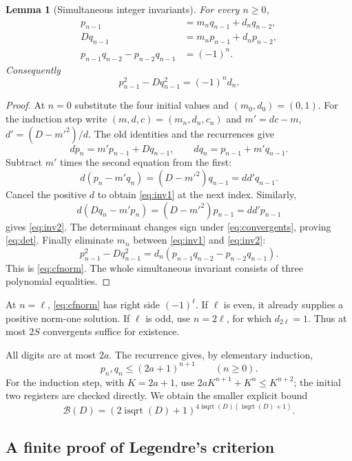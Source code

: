 \documentclass[11pt,letterpaper]{article}
\newtheorem{lemma}[theorem]{Lemma}
\theoremstyle{definition}
\newcommand{\isqrt}{\operatorname{isqrt}}
\newcommand{\CFB}{\mathcal B}
\begin{document}
\begin{lemma}[Simultaneous integer invariants]\label{lem:cfinvariants}
For every $n\ge0$,
\begin{align}
 p_{n-1}&=m_nq_{n-1}+d_nq_{n-2},\label{eq:inv1}\\
 Dq_{n-1}&=m_np_{n-1}+d_np_{n-2},\label{eq:inv2}\\
 p_{n-1}q_{n-2}-p_{n-2}q_{n-1}&=(-1)^n.\label{eq:det}
\end{align}
Consequently
\begin{equation}\label{eq:cfnorm}
 \boxed{p_{n-1}^2-Dq_{n-1}^2=(-1)^n d_n.}
\end{equation}
\end{lemma}
\begin{proof}
At $n=0$ substitute the four initial values and $(m_0,d_0)=(0,1)$.
For the induction step write $(m,d,c)=(m_n,d_n,c_n)$ and
$m'=dc-m$, $d'=(D-m'^2)/d$. The old identities and the recurrences give
\[
 dp_n=m'p_{n-1}+Dq_{n-1},\qquad
 dq_n=p_{n-1}+m'q_{n-1}.
\]
Subtract $m'$ times the second equation from the first:
\[
 d(p_n-m'q_n)=(D-m'^2)q_{n-1}=dd'q_{n-1}.
\]
Cancel the positive $d$ to obtain \eqref{eq:inv1} at the next index.
Similarly,
\[
 d(Dq_n-m'p_n)=(D-m'^2)p_{n-1}=dd'p_{n-1}
\]
gives \eqref{eq:inv2}. The determinant changes sign under
\eqref{eq:convergents}, proving \eqref{eq:det}.
Finally eliminate $m_n$ between \eqref{eq:inv1} and \eqref{eq:inv2}:
\[
 p_{n-1}^2-Dq_{n-1}^2
 =d_n(p_{n-1}q_{n-2}-p_{n-2}q_{n-1}).
\]
This is \eqref{eq:cfnorm}. The whole simultaneous invariant consists of
three polynomial equalities.
\end{proof}

At $n=\ell$, \eqref{eq:cfnorm} has right side $(-1)^\ell$.
If $\ell$ is even, it already supplies a positive norm-one solution.
If $\ell$ is odd, use $n=2\ell$, for which $d_{2\ell}=1$.
Thus at most $2S$ convergents suffice for existence.

All digits are at most $2a$. The recurrence gives, by elementary induction,
\begin{equation}\label{eq:convbound}
 p_n,q_n\le(2a+1)^{n+1}\qquad(n\ge0).
\end{equation}
For the induction step, with $K=2a+1$, use
$2aK^{n+1}+K^n\le K^{n+2}$; the initial two registers are checked directly.
We obtain the smaller explicit bound
\begin{equation}\label{eq:B}
 \boxed{\CFB(D)=(2\isqrt(D)+1)^{4\isqrt(D)(\isqrt(D)+1)}.}
\end{equation}

\subsection{A finite proof of Legendre's criterion}\label{sec:legendre}
\end{document}
